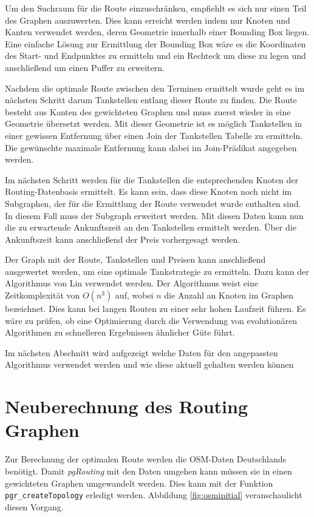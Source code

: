 \documentclass[
ngerman          %
,a4paper          %
,11pt
,pdftex
]{report}
\begin{document}
Um den Suchraum für die Route einzuschränken, empfiehlt es sich nur einen Teil des Graphen auszuwerten. Dies kann erreicht werden indem nur Knoten und Kanten verwendet werden, deren Geometrie innerhalb einer Bounding Box liegen. Eine einfache Lösung zur Ermittlung der Bounding Box wäre es die Koordinaten des Start- und Endpunktes zu ermitteln und ein Rechteck um diese zu legen und anschließend um einen Puffer zu erweitern.

Nachdem die optimale Route zwischen den Terminen ermittelt wurde geht es im nächsten Schritt darum Tankstellen entlang dieser Route zu finden. Die Route besteht aus Kanten des gewichteten Graphen und muss zuerst wieder in eine Geometrie übersetzt werden. Mit dieser Geometrie ist es möglich Tankstellen in einer gewissen Entfernung über einen Join der Tankstellen Tabelle zu ermitteln. Die gewünschte maximale Entfernung kann dabei im Join-Prädikat angegeben werden.

Im nächsten Schritt werden für die Tankstellen die entsprechenden Knoten der Routing-Datenbasis ermittelt. Es kann sein, dass diese Knoten noch nicht im Subgraphen, der für die Ermittlung der Route verwendet wurde enthalten sind. In diesem Fall muss der Subgraph erweitert werden. Mit diesen Daten kann nun die zu erwartende Ankunftszeit an den Tankstellen ermittelt werden. Über die Ankunftszeit kann anschließend der Preis vorhergesagt werden.

Der Graph mit der Route, Tankstellen und Preisen kann anschließend ausgewertet werden, um eine optimale Tankstrategie zu ermitteln. Dazu kann der Algorithmus von Lin \cite{transnet} verwendet werden. Der Algorithmus weist eine Zeitkomplexität von \(O(n^3)\) auf, wobei \(n\) die Anzahl an Knoten im Graphen bezeichnet. Dies kann bei langen Routen zu einer sehr hohen Laufzeit führen. Es wäre zu prüfen, ob eine Optimierung durch die Verwendung von evolutionären Algorithmen zu schnelleren Ergebnissen ähnlicher Güte führt.

Im nächsten Abschnitt wird aufgezeigt welche Daten für den angepassten Algorithmus verwendet werden und wie diese aktuell gehalten werden können

\section{Neuberechnung des Routing Graphen}
\label{sec:org520d5e2}
Zur Berechnung der optimalen Route werden die \ac{OSM}-Daten Deutschlands benötigt. Damit \emph{pgRouting} mit den Daten umgehen kann müssen sie in einen gewichteten Graphen umgewandelt werden. Dies kann mit der Funktion \texttt{pgr\_createTopology} erledigt werden. Abbildung \ref{fig:osminitial} veranschaulicht diesen Vorgang.
\end{document}
